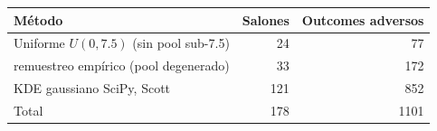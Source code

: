 \begin{tabular}{lrr}
\toprule
Método & Salones & Outcomes adversos \\
\midrule
Uniforme $U(0,7.5)$ (sin pool sub-7.5) & 24 & 77 \\
remuestreo empírico (pool degenerado) & 33 & 172 \\
KDE gaussiano SciPy, Scott & 121 & 852 \\
\midrule
Total & 178 & 1101 \\
\bottomrule
\end{tabular}
